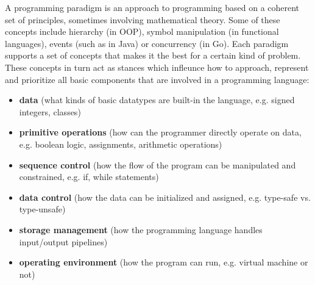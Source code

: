 \documentclass{article}
\begin{document}
A programming paradigm is an approach to programming based on a coherent set of principles, sometimes involving mathematical theory. Some of these concepts include hierarchy (in OOP), symbol manipulation (in functional languages), events (such as in Java) or concurrency (in Go). Each paradigm supports a set of concepts that makes it the best for a certain kind of problem\cite{van_roy_programming_2012}. These concepts in turn act as stances which infleunce how to approach, represent and prioritize all basic components that are involved in a programming language:

\begin{itemize}
  \item \textbf{data} (what kinds of basic datatypes are built-in the language, e.g. signed integers, classes)
  \item \textbf{primitive operations} (how can the programmer directly operate on data, e.g. boolean logic, assignments, arithmetic operations)
  \item \textbf{sequence control} (how the flow of the program can be manipulated and constrained, e.g. if, while statements)
  \item \textbf{data control} (how the data can be initialized and assigned, e.g. type-safe vs. type-unsafe)
  \item \textbf{storage management} (how the programming language handles input/output pipelines)
  \item \textbf{operating environment} (how the program can run, e.g. virtual machine or not)
\end{itemize}
\end{document}
